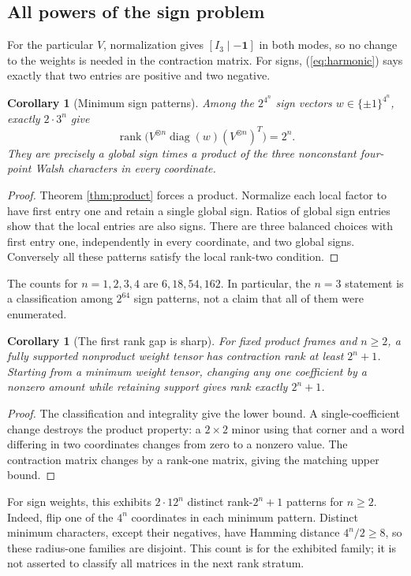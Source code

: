\documentclass[11pt,letterpaper]{article}
\newtheorem{corollary}[theorem]{Corollary}
\theoremstyle{definition}\newtheorem{definition}[theorem]{Definition}
\theoremstyle{remark}\newtheorem{remark}[theorem]{Remark}
\DeclareMathOperator{\rank}{rank}
\DeclareMathOperator{\diag}{diag}
\newcommand{\one}{\mathbf 1}
\begin{document}
\subsection{All powers of the sign problem}
For the particular $V$, normalization gives $[I_3\mid-\one]$ in both modes, so no change to the weights is needed in the contraction matrix. For signs, (\ref{eq:harmonic}) says exactly that two entries are positive and two negative.

\begin{corollary}[Minimum sign patterns]\label{cor:sign}
Among the $2^{4^n}$ sign vectors $w\in\{\pm1\}^{4^n}$, exactly $2\cdot3^n$ give
\[
\rank\bigl(V^{\otimes n}\diag(w)(V^{\otimes n})^T\bigr)=2^n.
\]
They are precisely a global sign times a product of the three nonconstant four-point Walsh characters in every coordinate.
\end{corollary}
\begin{proof}
Theorem \ref{thm:product} forces a product. Normalize each local factor to have first entry one and retain a single global sign. Ratios of global sign entries show that the local entries are also signs. There are three balanced choices with first entry one, independently in every coordinate, and two global signs. Conversely all these patterns satisfy the local rank-two condition.
\end{proof}
The counts for $n=1,2,3,4$ are $6,18,54,162$. In particular, the $n=3$ statement is a classification among $2^{64}$ sign patterns, not a claim that all of them were enumerated.

\begin{corollary}[The first rank gap is sharp]\label{cor:gap}
For fixed product frames and $n\geq2$, a fully supported nonproduct weight tensor has contraction rank at least $2^n+1$. Starting from a minimum weight tensor, changing any one coefficient by a nonzero amount while retaining support gives rank exactly $2^n+1$.
\end{corollary}
\begin{proof}
The classification and integrality give the lower bound. A single-coefficient change destroys the product property: a $2\times2$ minor using that corner and a word differing in two coordinates changes from zero to a nonzero value. The contraction matrix changes by a rank-one matrix, giving the matching upper bound.
\end{proof}
For sign weights, this exhibits $2\cdot12^n$ distinct rank-$2^n+1$ patterns for $n\geq2$. Indeed, flip one of the $4^n$ coordinates in each minimum pattern. Distinct minimum characters, except their negatives, have Hamming distance $4^n/2\geq8$, so these radius-one families are disjoint. This count is for the exhibited family; it is not asserted to classify all matrices in the next rank stratum.
\end{document}

